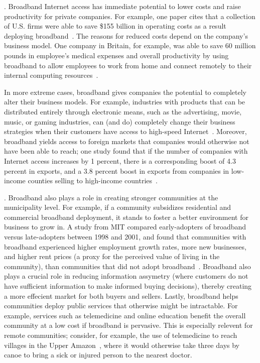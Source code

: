 . Broadband Internet access has immediate potential to lower costs
 and raise productivity for private companies. For example, one paper cites that a collection of U.S. firms
 were able to save \$155 billion in operating costs as a result deploying broadband~\cite{varian2002net}.
 The reasons for reduced costs depend on the company's business model. One company in Britain, for example,
 was able to save 60 million pounds in employee's medical expenses and overall productivity by using broadband
 to allow employees to work from home and connect remotely to their internal computing resources~\cite{bband_stakeholder}.

 In more extreme cases, broadband gives companies the potential to completely alter their business models.
 For example, industries with products that can be distributed entirely through electronic means, such as the
 advertising, movie, music, or gaming industries, can (and do) completely change their business strategies when their
 customers have access to high-speed Internet~\cite{heng2006media}. Moreover, broadband yields access to
 foreign markets that companies would otherwise not have been able to reach; one study found that if the number of
 companies with Internet access increases by 1 percent, there is a corresponding boost of 4.3 percent in exports, and a
 3.8 percent boost in exports from companies in low-income counties selling to high-income countries~\cite{clarke2004has}.

. Broadband also plays a role in
creating stronger communities at the municipality level. For example, if a
community subsidizes residential and commercial broadband deployment, it
stands to foster a better environment for business to grow
in. A study from MIT compared early-adopters
of broadband versus late-adopters between 1998 and 2001, and found that
communities with broadband experienced higher employment growth rates, more
new businesses, and higher
rent prices (a proxy for the perceived value of living in the community), than
communities that did not adopt broadband~\cite{gillett2006measuring}.
Broadband also plays a crucial role in reducing information assymetry (where
customers do not have sufficient information to make informed buying
decisions), thereby creating a more effecient market for both buyers and
sellers. Lastly, broadband helps communities deploy public services that
otherwise might be intractable. For example, services such as telemedicine and online education
benefit the overall community at a low cost if broadband is pervasive. This is
especially relevent for remote communities; consider, for example, the use of telemedicine
 to reach villages in the Upper Amazon~\cite{wootton2010circumstances}, where it would otherwise
 take three days by canoe to bring a sick or injured person to the nearest doctor.

